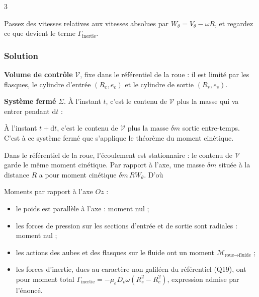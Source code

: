 \documentclass[11pt,a4paper]{article}
\providecommand{\tightlist}{\setlength{\itemsep}{0pt}\setlength{\parskip}{0pt}}
\newcommand{\equationajustee}[1]{%
  \sbox{\boiteequation}{$\displaystyle #1$}%
  \ifdim\wd\boiteequation>\linewidth
    \[\resizebox{\linewidth}{!}{\usebox{\boiteequation}}\]%
  \else
    \[#1\]%
  \fi}
\begin{document}
\begin{indication}{3}

Passez des vitesses relatives aux vitesses absolues par \(W_\theta=V_\theta-\omega R\), et regardez ce que devient le terme \(\Gamma_{\text{inertie}}\).

\end{indication}

\hypertarget{solution-19}{%
\subsubsection{Solution}\label{solution-19}}

\textbf{Volume de contrôle} \(\mathcal V\), fixe dans le référentiel de la roue : il est limité par les flasques, le cylindre d'entrée \((R_e,e_e)\) et le cylindre de sortie \((R_s,e_s)\).

\textbf{Système fermé} \(\Sigma\). À l'instant \(t\), c'est le contenu de \(\mathcal V\) plus la masse qui va entrer pendant \(\mathrm dt\) :

\equationajustee{\delta m=\mu_eD_v\,\mathrm dt.}

À l'instant \(t+\mathrm dt\), c'est le contenu de \(\mathcal V\) plus la masse \(\delta m\) sortie entre-temps. C'est à ce système fermé que s'applique le théorème du moment cinétique.

Dans le référentiel de la roue, l'écoulement est stationnaire : le contenu de \(\mathcal V\) garde le même moment cinétique. Par rapport à l'axe, une masse \(\delta m\) située à la distance \(R\) a pour moment cinétique \(\delta m\,RW_\theta\). D'où

\equationajustee{\frac{\mathrm dL_z(\Sigma)}{\mathrm dt}=\mu_eD_v\big(R_sW_{\theta,s}-R_eW_{\theta,e}\big).}

Moments par rapport à l'axe \(Oz\) :

\begin{itemize}
\tightlist
\item
  le poids est parallèle à l'axe : moment nul ;
\item
  les forces de pression sur les sections d'entrée et de sortie sont radiales : moment nul ;
\item
  les actions des aubes et des flasques sur le fluide ont un moment \(\mathcal M_{\text{roue}\to\text{fluide}}\) ;
\item
  les forces d'inertie, dues au caractère non galiléen du référentiel (Q19), ont pour moment total \(\Gamma_{\text{inertie}}=-\mu_eD_v\omega(R_s^2-R_e^2)\), expression admise par l'énoncé.
\end{itemize}
\end{document}
